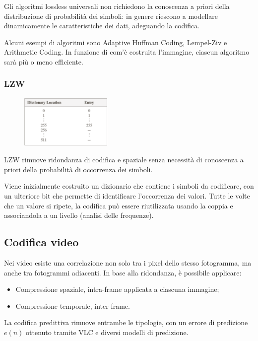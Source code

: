 Gli algoritmi lossless universali non richiedono la conoscenza a priori della distribuzione di probabilità dei simboli: in genere riescono a modellare dinamicamente le caratteristiche dei dati, adeguando la codifica.

Alcuni esempi di algoritmi sono Adaptive Huffman Coding, Lempel-Ziv e Arithmetic Coding. In funzione di com'è costruita l'immagine, ciascun algoritmo sarà più o meno efficiente. 

\newpage
\subsubsection{LZW}
 \begin{figure}
	\vspace{-15pt}
	\includegraphics[width=0.4\textwidth]{Lezioni/Immagini/dizionario}
	\vspace{-20pt}
\end{figure}

LZW rimuove ridondanza di codifica e spaziale senza necessità di conoscenza a priori della probabilità di occorrenza dei simboli.

Viene inizialmente costruito un dizionario che contiene i simboli da codificare, con un ulteriore bit che permette di identificare l'occorrenza dei valori. Tutte le volte che un valore si ripete, la codifica può essere riutilizzata usando la coppia e associandola a un livello (analisi delle frequenze). 

\subsection{Codifica video}
Nei video esiste una correlazione non solo tra i pixel dello stesso fotogramma, ma anche tra fotogrammi adiacenti. In base alla ridondanza, è possibile applicare:
\begin{itemize}
	\item Compressione spaziale, intra-frame applicata a ciascuna immagine;
	\item Compressione temporale, inter-frame.
\end{itemize}

La codifica predittiva rimuove entrambe le tipologie, con un errore di predizione $e(n)$ ottenuto tramite VLC e diversi modelli di predizione.


